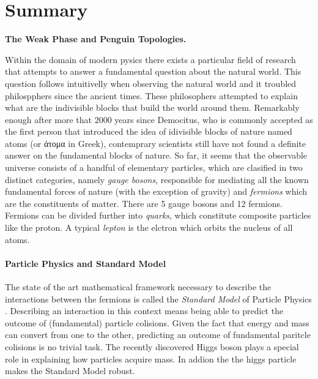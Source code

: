 \chapter*{Summary}
\chaptermark{}

{\Large\bf
  The Weak Phase \phis and Penguin Topologies.
}
\vspace*{0.05\textwidth}

Within the domain of modern pysics there exists a particular field of research
that attempts to answer a fundamental question about the natural world. This
question follows intuitivelly when observing the natural world and it troubled
philospphers since the ancient times. These philosophers attempted to explain
what are the indivisible blocks that build the world around them. Remarkably
enough after more that 2000 years since Democitus, who is commonly accepted as
the first person that introduced the idea of idivisible blocks of nature named
atoms (or \textgreek{άτομα} in Greek), contemprary scientists still have not found a definite
answer on the fundamental blocks of nature. So far, it seems that the observable
universe consists of a handful of elementary particles, which are clasified in two
distinct categories, namely {\it gauge bosons}, responsible for mediating all the
known fundamental forces of nature (with the exception of gravity) and {\it fermions}
which are the constituents of matter. There are 5 gauge bosons and 12 fermions.
Fermions can be divided further into {\it quarks}, which constitute composite
particles like the proton. A typical {\it lepton} is the elctron which orbits
the nucleus of all atoms.

\subsubsection{Particle Physics and Standard Model}
The state of the art mathematical framework necessary to describe the interactions between the
fermions is called the \textit{Standard Model} of Particle Physics \cite{sm-glashow,sm-weinberg,sm-salam}.
Describing an interaction in this context means being able to predict the outcome
of (fundamental) particle colisions. Given the fact that energy and mass can convert
from one to the other, predicting an outcome of fundamental paritcle colisions is no
trivial task. The recently discovered Higgs boson \cite{higgs-cms,higgs-atlas}
plays a special role in explaining how particles acquire mass. In addion the the higgs
particle makes the Standard Model robust.

